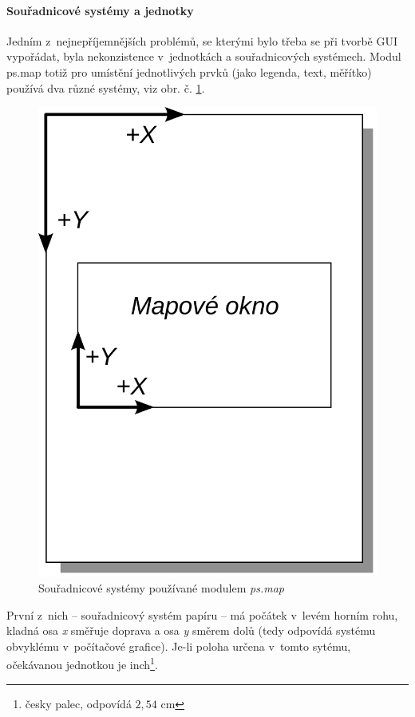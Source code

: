 \documentclass[a4paper,12pt,draft]{article}
\newcommand{\modul}[1]{\emph{#1}}
\begin{document}
\paragraph*{Souřadnicové systémy a jednotky}
\label{sec:psmap:sour_systemy}
Jedním z~nejnepříjemnějších problémů, se kterými bylo třeba se při
tvorbě GUI vypořádat, byla nekonzistence v~jednotkách a souřadnicových
systémech. Modul ps.map totiž pro umístění jednotlivých prvků
(jako legenda, text, měřítko) používá dva různé systémy, viz
obr. č. \ref{fig:sour_systemy}.

\begin{figure}[h!]
    \centering
    \includegraphics[width=0.2\textheight]{sour_systemy.pdf}
    \caption{Souřadnicové systémy používané modulem
    \modul{ps.map}\label{fig:sour_systemy}}
\end{figure}


První z~nich -- souřadnicový systém papíru -- má počátek v~levém
horním rohu, kladná osa \emph{x} směřuje doprava a osa \emph{y} směrem
dolů (tedy odpovídá systému obvyklému v~počítačové grafice).
Je-li poloha určena v~tomto sytému, očekávanou jednotkou je inch\footnote{
česky palec, odpovídá $2{,}54$ cm}.
\end{document}
